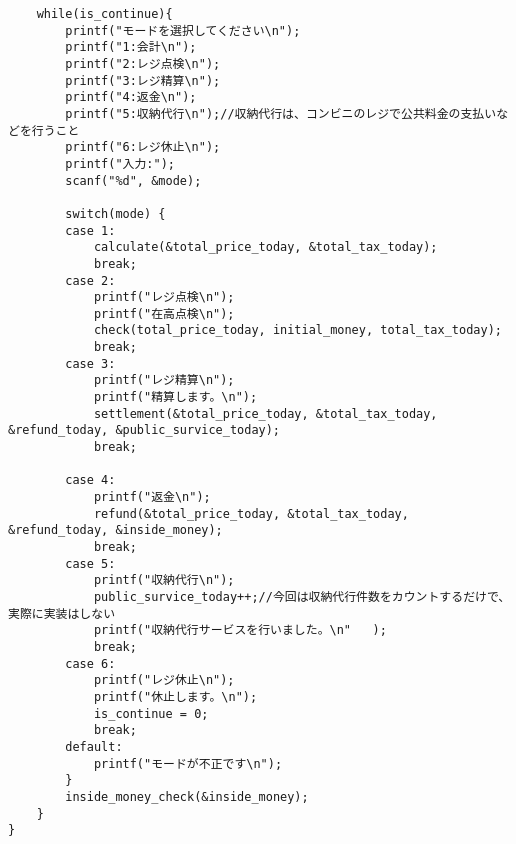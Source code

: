 \documentclass[a4j,11pt]{jarticle}
\begin{document}
\begin{lstlisting}
    while(is_continue){
        printf("モードを選択してください\n");
        printf("1:会計\n");
        printf("2:レジ点検\n");
        printf("3:レジ精算\n");
        printf("4:返金\n");
        printf("5:収納代行\n");//収納代行は、コンビニのレジで公共料金の支払いなどを行うこと
        printf("6:レジ休止\n");
        printf("入力:");
        scanf("%d", &mode);

        switch(mode) {
        case 1:
            calculate(&total_price_today, &total_tax_today);
            break;
        case 2:
            printf("レジ点検\n");
            printf("在高点検\n");
            check(total_price_today, initial_money, total_tax_today);
            break;
        case 3:
            printf("レジ精算\n");
            printf("精算します。\n");
            settlement(&total_price_today, &total_tax_today, &refund_today, &public_survice_today);
            break;
        
        case 4:
            printf("返金\n");
            refund(&total_price_today, &total_tax_today, &refund_today, &inside_money);
            break;
        case 5:
            printf("収納代行\n");
            public_survice_today++;//今回は収納代行件数をカウントするだけで、実際に実装はしない
            printf("収納代行サービスを行いました。\n"   );
            break;
        case 6:
            printf("レジ休止\n");
            printf("休止します。\n");
            is_continue = 0;
            break;
        default:
            printf("モードが不正です\n");
        }
        inside_money_check(&inside_money);
    }
}
  
  \end{lstlisting}
\fontsize{10pt}{10pt}\selectfont
\end{document}
